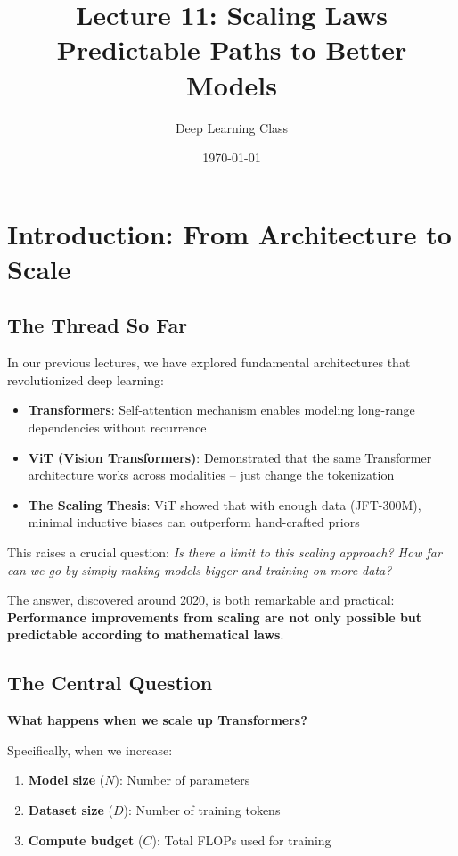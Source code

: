 \documentclass{article}
\title{Lecture 11: Scaling Laws\\Predictable Paths to Better Models}
\author{Deep Learning Class}
\date{\today}
\begin{document}
\maketitle

\section{Introduction: From Architecture to Scale}

\subsection{The Thread So Far}

In our previous lectures, we have explored fundamental architectures that revolutionized deep learning:

\begin{itemize}
\item \textbf{Transformers}: Self-attention mechanism enables modeling long-range dependencies without recurrence
\item \textbf{ViT (Vision Transformers)}: Demonstrated that the same Transformer architecture works across modalities -- just change the tokenization
\item \textbf{The Scaling Thesis}: ViT showed that with enough data (JFT-300M), minimal inductive biases can outperform hand-crafted priors
\end{itemize}

This raises a crucial question: \textit{Is there a limit to this scaling approach? How far can we go by simply making models bigger and training on more data?}

The answer, discovered around 2020, is both remarkable and practical: \textbf{Performance improvements from scaling are not only possible but predictable according to mathematical laws}.

\subsection{The Central Question}

\textbf{What happens when we scale up Transformers?}

Specifically, when we increase:
\begin{enumerate}
\item \textbf{Model size} ($N$): Number of parameters
\item \textbf{Dataset size} ($D$): Number of training tokens
\item \textbf{Compute budget} ($C$): Total FLOPs used for training
\end{enumerate}
\end{document}
